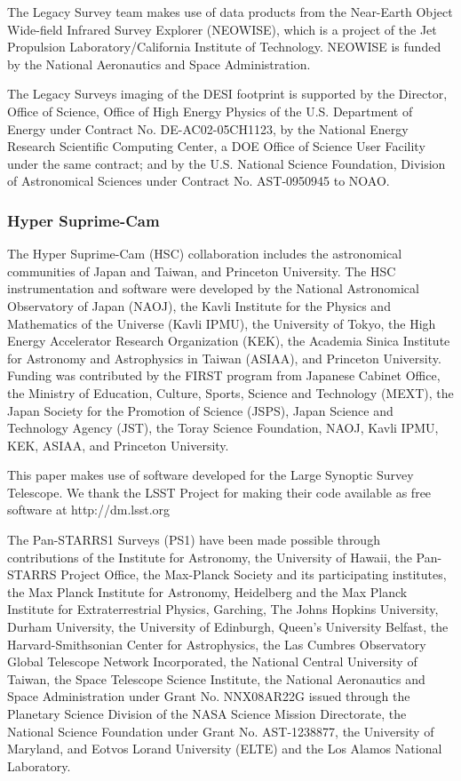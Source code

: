 \documentclass[]{polymathic}
\begin{document}
The Legacy Survey team makes use of data products from the Near-Earth Object Wide-field Infrared Survey Explorer (NEOWISE), which is a project of the Jet Propulsion Laboratory/California Institute of Technology. NEOWISE is funded by the National Aeronautics and Space Administration.

The Legacy Surveys imaging of the DESI footprint is supported by the Director, Office of Science, Office of High Energy Physics of the U.S. Department of Energy under Contract No. DE-AC02-05CH1123, by the National Energy Research Scientific Computing Center, a DOE Office of Science User Facility under the same contract; and by the U.S. National Science Foundation, Division of Astronomical Sciences under Contract No. AST-0950945 to NOAO.

\subsubsection{Hyper Suprime-Cam}
The Hyper Suprime-Cam (HSC) collaboration includes the astronomical communities of Japan and Taiwan, and Princeton University. The HSC instrumentation and software were developed by the National Astronomical Observatory of Japan (NAOJ), the Kavli Institute for the Physics and Mathematics of the Universe (Kavli IPMU), the University of Tokyo, the High Energy Accelerator Research Organization (KEK), the Academia Sinica Institute for Astronomy and Astrophysics in Taiwan (ASIAA), and Princeton University. Funding was contributed by the FIRST program from Japanese Cabinet Office, the Ministry of Education, Culture, Sports, Science and Technology (MEXT), the Japan Society for the Promotion of Science (JSPS), Japan Science and Technology Agency (JST), the Toray Science Foundation, NAOJ, Kavli IPMU, KEK, ASIAA, and Princeton University. 

This paper makes use of software developed for the Large Synoptic Survey Telescope. We thank the LSST Project for making their code available as free software at  http://dm.lsst.org

The Pan-STARRS1 Surveys (PS1) have been made possible through contributions of the Institute for Astronomy, the University of Hawaii, the Pan-STARRS Project Office, the Max-Planck Society and its participating institutes, the Max Planck Institute for Astronomy, Heidelberg and the Max Planck Institute for Extraterrestrial Physics, Garching, The Johns Hopkins University, Durham University, the University of Edinburgh, Queen’s University Belfast, the Harvard-Smithsonian Center for Astrophysics, the Las Cumbres Observatory Global Telescope Network Incorporated, the National Central University of Taiwan, the Space Telescope Science Institute, the National Aeronautics and Space Administration under Grant No. NNX08AR22G issued through the Planetary Science Division of the NASA Science Mission Directorate, the National Science Foundation under Grant No. AST-1238877, the University of Maryland, and Eotvos Lorand University (ELTE) and the Los Alamos National Laboratory.
\end{document}
